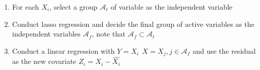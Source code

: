 \documentclass[]{article}
\providecommand{\tightlist}{%
  \setlength{\itemsep}{0pt}\setlength{\parskip}{0pt}}
\begin{document}
\begin{enumerate}
\def\labelenumi{\arabic{enumi}.}
\tightlist
\item
  For each \(X_i\), select a group \(\mathcal{A}_t\) of variable as the
  independent variable
\item
  Conduct lasso regression and decide the final group of active
  variables as the independent variables \(\mathcal{A}_f\), note that
  \(\mathcal{A}_f \subset \mathcal{A}_t\)
\item
  Conduct a linear regression with
  \(Y = X_i ~~ X = X_j, j\in\mathcal{A}_f\) and use the residual as the
  new covariate \(Z_i = X_i - \hat{X_i}\)
\end{enumerate}
\end{document}
